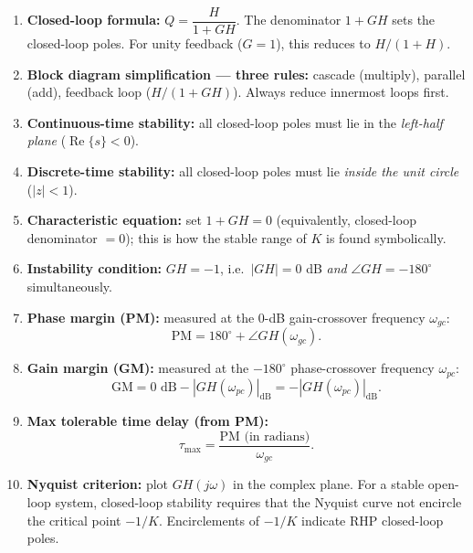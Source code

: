 \documentclass[11pt]{article}
\begin{document}
\begin{enumerate}[leftmargin=*]
  \item \textbf{Closed-loop formula:} $Q = \dfrac{H}{1+GH}$. The denominator $1+GH$ sets the
        closed-loop poles. For unity feedback ($G=1$), this reduces to $H/(1+H)$.
  \item \textbf{Block diagram simplification --- three rules:} cascade (multiply), parallel (add),
        feedback loop ($H/(1+GH)$). Always reduce innermost loops first.
  \item \textbf{Continuous-time stability:} all closed-loop poles must lie in the
        \emph{left-half plane} ($\operatorname{Re}\{s\}<0$).
  \item \textbf{Discrete-time stability:} all closed-loop poles must lie \emph{inside the unit circle}
        ($|z|<1$).
  \item \textbf{Characteristic equation:} set $1+GH=0$ (equivalently, closed-loop denominator $=0$);
        this is how the stable range of $K$ is found symbolically.
  \item \textbf{Instability condition:} $GH=-1$, i.e.\ $|GH|=0$ dB \emph{and}
        $\angle GH=-180^\circ$ simultaneously.
  \item \textbf{Phase margin (PM):} measured at the 0-dB gain-crossover frequency $\omega_{gc}$:
        \[\text{PM} = 180^\circ + \angle GH(\omega_{gc}).\]
  \item \textbf{Gain margin (GM):} measured at the $-180^\circ$ phase-crossover frequency $\omega_{pc}$:
        \[\text{GM} = 0\text{ dB} - |GH(\omega_{pc})|_{\text{dB}} = -|GH(\omega_{pc})|_{\text{dB}}.\]
  \item \textbf{Max tolerable time delay (from PM):}
        \[\tau_{\max} = \frac{\text{PM (in radians)}}{\omega_{gc}}.\]
  \item \textbf{Nyquist criterion:} plot $GH(j\omega)$ in the complex plane. For a stable open-loop system,
        closed-loop stability requires that the Nyquist curve not encircle the critical point $-1/K$.
        Encirclements of $-1/K$ indicate RHP closed-loop poles.
\end{enumerate}
\end{document}
